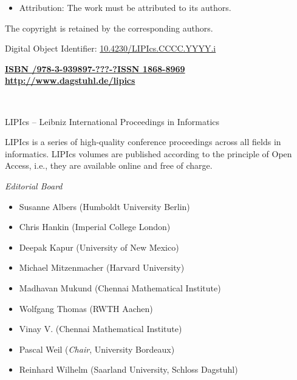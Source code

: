 \documentclass[a4paper,UKenglish]{lipicsmaster}
\begin{document}
\begin{publicationinfo}
\begin{itemize}
\item Attribution: The work must be attributed to its authors.
\end{itemize}

\smallskip

The copyright is retained by the corresponding authors.

\bigskip
\bigskip
\bigskip
\bigskip

Digital Object Identifier: \href{http://dx.doi.org/10.4230/LIPIcs.CCCC.YYYY.i}{10.4230/LIPIcs.CCCC.YYYY.i}

\vfill
\textbf{\href{http://www.dagstuhl.de/dagpub//978-3-939897-???-?}{ISBN /978-3-939897-???-?}}\qquad \qquad \textbf{\href{http://drops.dagstuhl.de/lipics}{ISSN 1868-8969}}  \hfill \textbf{\href{http://www.dagstuhl.de/lipics}{http://www.dagstuhl.de/lipics}}

  
 \newpage

\ \\
\bigskip
\bigskip
\bigskip

{\Large LIPIcs -- Leibniz International Proceedings in Informatics}
 
 \bigskip
 
LIPIcs is a series of high-quality conference proceedings across all fields in informatics. 
LIPIcs volumes are published according to the principle of Open Access, i.e., they are available online and free of charge. 

 
 \bigskip
 \bigskip
 \bigskip
 
 
\emph{Editorial Board}

\begin{itemize} 
\item Susanne Albers (Humboldt University Berlin)
\item Chris Hankin (Imperial College London)
\item Deepak Kapur (University of New Mexico)
\item Michael Mitzenmacher (Harvard University)
\item Madhavan Mukund	(Chennai Mathematical Institute)
\item Wolfgang Thomas (RWTH Aachen)
\item Vinay V. (Chennai Mathematical Institute)
\item Pascal Weil (\emph{Chair}, University Bordeaux)
\item Reinhard Wilhelm (Saarland University, Schloss Dagstuhl)
 \end{itemize}



\end{publicationinfo}
\end{document}
